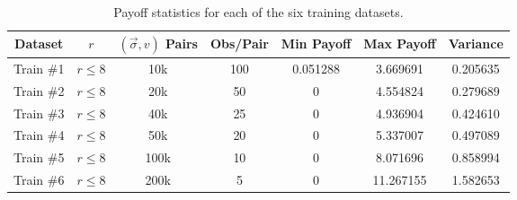 \begin{table}[htb]
\begin{tabular}{c|c|c|c|c|c|c}
Dataset   & $r$          & $(\vec{\sigma}, v)$ Pairs & Obs/Pair & Min Payoff & Max Payoff & Variance \\
\hline 
Train \#1 & $r \leq 8$ & 10k                       & 100      & 0.051288   & 3.669691   & 0.205635 \\
Train \#2 & $r \leq 8$ & 20k                       & 50       & 0          & 4.554824   & 0.279689 \\
Train \#3 & $r \leq 8$ & 40k                       & 25       & 0          & 4.936904   & 0.424610 \\
Train \#4 & $r \leq 8$ & 50k                       & 20       & 0          & 5.337007   & 0.497089 \\
Train \#5 & $r \leq 8$ & 100k                      & 10       & 0          & 8.071696   & 0.858994 \\
Train \#6 & $r \leq 8$ & 200k                      & 5        & 0          & 11.267155  & 1.582653
\end{tabular}
\caption{Payoff statistics for each of the six training datasets.}
\label{table:game1_train_payoff_stats}
\end{table}


